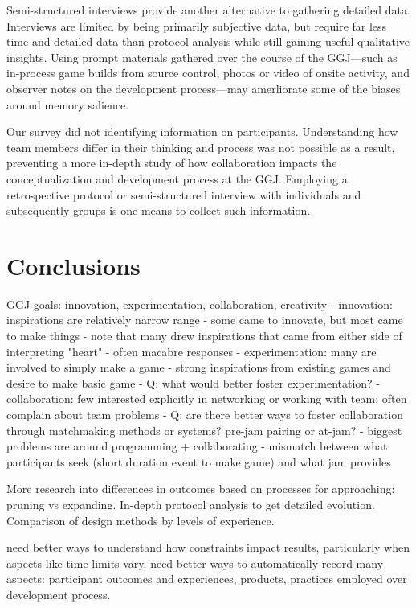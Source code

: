 \documentclass{sig-alternate}
\begin{document}
Semi-structured interviews provide another alternative to gathering detailed data. Interviews are limited by being primarily subjective data, but require far less time and detailed data than protocol analysis while still gaining useful qualitative insights. Using prompt materials gathered over the course of the GGJ---such as in-process game builds from source control, photos or video of onsite activity, and observer notes on the development process---may amerliorate some of the biases around memory salience.

Our survey did not identifying information on participants. Understanding how team members differ in their thinking and process was not possible as a result, preventing a more in-depth study of how collaboration impacts the conceptualization and development process at the GGJ. Employing a retrospective protocol or semi-structured interview with individuals and subsequently groups is one means to collect such information.


\section{Conclusions}
GGJ goals: innovation, experimentation, collaboration, creativity
- innovation: inspirations are relatively narrow range
	- some came to innovate, but most came to make things
	- note that many drew inspirations that came from either side of interpreting "heart" - often macabre responses
- experimentation: many are involved to simply make a game
	- strong inspirations from existing games and desire to make basic game
	- Q: what would better foster experimentation?
- collaboration: few interested explicitly in networking or working with team; often complain about team problems
	- Q: are there better ways to foster collaboration through matchmaking methods or systems? pre-jam pairing or at-jam?
- biggest problems are around programming + collaborating
	- mismatch between what participants seek (short duration event to make game) and what jam provides

More research into differences in outcomes based on processes for approaching: pruning vs expanding. In-depth protocol analysis to get detailed evolution. Comparison of design methods by levels of experience.

need better ways to understand how constraints impact results, particularly when aspects like time limits vary. need better ways to automatically record many aspects: participant outcomes and experiences, products, practices employed over development process.
\end{document}
